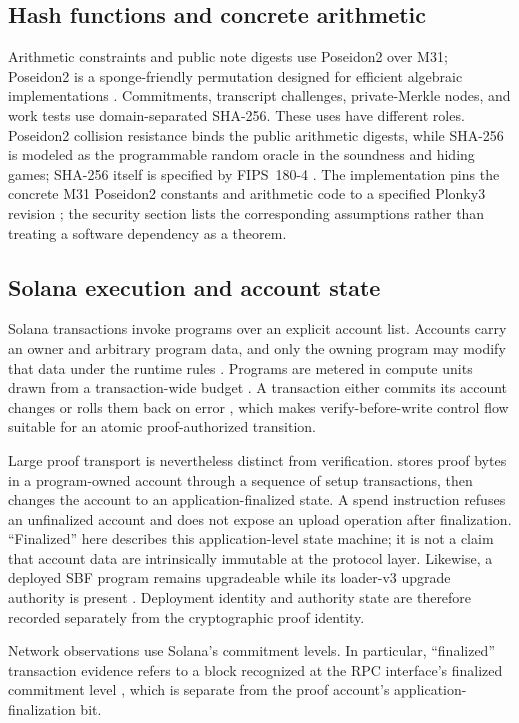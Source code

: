\subsection{Hash functions and concrete arithmetic}

Arithmetic constraints and public note digests use Poseidon2 over M31;
Poseidon2 is a sponge-friendly permutation designed for efficient algebraic
implementations \cite{GrassiKhovratovichSchofnegger2023}.  Commitments, transcript
challenges, private-Merkle nodes, and work tests use domain-separated SHA-256.
These uses have different roles.  Poseidon2 collision resistance binds the
public arithmetic digests, while SHA-256 is modeled as the programmable random
oracle in the soundness and hiding games; SHA-256 itself is specified by
FIPS~180-4 \cite{NISTFIPS1804}.  The implementation pins the
concrete M31 Poseidon2 constants and arithmetic code to a specified Plonky3
revision \cite{Plonky3M31Poseidon2Version061}; the security section lists the corresponding
assumptions rather than treating a software dependency as a theorem.

\subsection{Solana execution and account state}

Solana transactions invoke programs over an explicit account list.  Accounts
carry an owner and arbitrary program data, and only the owning program may
modify that data under the runtime rules \cite{SolanaAccounts}.  Programs are
metered in compute units drawn from a transaction-wide budget
\cite{SolanaComputeBudget}.  A transaction either commits its account changes or
rolls them back on error \cite{SolanaTransactions,SolanaTransactionPipeline},
which makes verify-before-write control flow suitable for an atomic
proof-authorized transition.

Large proof transport is nevertheless distinct from verification.  \Profile{}
stores proof bytes in a program-owned account through a sequence of setup
transactions, then changes the account to an application-finalized state.  A
spend instruction refuses an unfinalized account and does not expose an upload
operation after finalization.  ``Finalized'' here describes this
application-level state machine; it is not a claim that account data are
intrinsically immutable at the protocol layer.  Likewise, a deployed SBF
program remains upgradeable while its loader-v3 upgrade authority is present
\cite{SolanaProgramDeployment}.  Deployment identity and authority state are
therefore recorded separately from the cryptographic proof identity.

Network observations use Solana's commitment levels.  In particular,
``finalized'' transaction evidence refers to a block recognized at the RPC
interface's finalized commitment level \cite{SolanaRPC}, which is
separate from the proof account's application-finalization bit.
